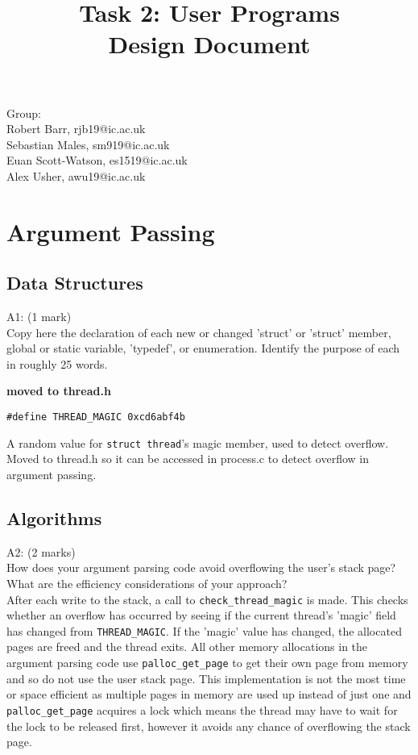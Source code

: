 \documentclass[11pt, a4paper]{article}
\begin{document}
\title{Task 2: User Programs\\Design Document}
\author{}
\date{}
\maketitle

\begin{center}
Group:\\
Robert Barr, rjb19@ic.ac.uk\\
Sebastian Males, sm919@ic.ac.uk\\
Euan Scott-Watson, es1519@ic.ac.uk\\
Alex Usher, awu19@ic.ac.uk
\end{center}

\section{Argument Passing}

\subsection{Data Structures}
A1: (1 mark)\\
Copy here the declaration of each new or changed 'struct' or 'struct' member,
global or static variable, 'typedef', or enumeration. Identify the purpose
of each in roughly 25 words.
\begin{center}\textbf{moved to thread.h}\end{center}
\begin{verbatim}
#define THREAD_MAGIC 0xcd6abf4b
\end{verbatim}
A random value for \verb|struct thread|'s magic member, used to detect overflow.
Moved to thread.h so it can be accessed in process.c to detect overflow in argument passing.

\subsection{Algorithms}
A2: (2 marks)\\
How does your argument parsing code avoid overflowing the user's stack page?
What are the efficiency considerations of your approach?\bigskip\\
After each write to the stack, a call to \verb|check_thread_magic| is made. This checks whether an overflow
has occurred by seeing if the current thread's 'magic' field has changed from \verb|THREAD_MAGIC|. If the 'magic'
value has changed, the allocated pages are freed and the thread exits. All other memory allocations in the
argument parsing code use \verb|palloc_get_page| to get their own page from memory and so do not use
the user stack page. This implementation is not the most time or space efficient as multiple pages in
memory are used up instead of just one and \verb|palloc_get_page| acquires a lock which means the thread may
have to wait for the lock to be released first, however it avoids any chance of overflowing the stack page.
\end{document}
